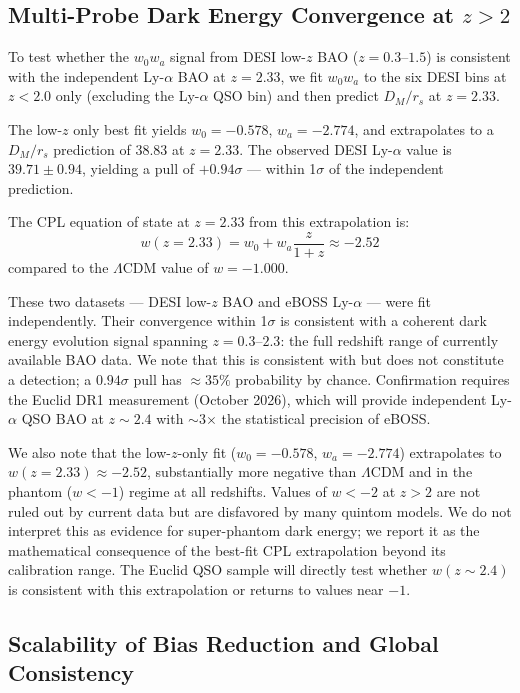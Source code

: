\documentclass[twocolumn]{aastex631}
\begin{document}
\subsection{Multi-Probe Dark Energy Convergence at $z > 2$}

To test whether the $w_0 w_a$ signal from DESI low-$z$ BAO ($z = 0.3$--$1.5$)
is consistent with the independent Ly-$\alpha$ BAO at $z = 2.33$, we fit
$w_0 w_a$ to the six DESI bins at $z < 2.0$ only (excluding the Ly-$\alpha$ QSO
bin) and then predict $D_M/r_s$ at $z = 2.33$.

The low-$z$ only best fit yields $w_0 = -0.578$, $w_a = -2.774$, and
extrapolates to a $D_M/r_s$ prediction of $38.83$ at $z = 2.33$.
The observed DESI Ly-$\alpha$ value is $39.71 \pm 0.94$, yielding a pull of
$+0.94\sigma$ --- within 1$\sigma$ of the independent prediction.

The CPL equation of state at $z = 2.33$ from this extrapolation is:
\begin{equation}
  w(z=2.33) = w_0 + w_a \frac{z}{1+z} \approx -2.52
\end{equation}
compared to the $\Lambda$CDM value of $w = -1.000$.

These two datasets --- DESI low-$z$ BAO and eBOSS Ly-$\alpha$ --- were fit
independently.
Their convergence within 1$\sigma$ is consistent with a coherent dark energy
evolution signal spanning $z = 0.3$--$2.3$: the full redshift range of
currently available BAO data.
We note that this is consistent with but does not constitute a detection;
a $0.94\sigma$ pull has $\approx35\%$ probability by chance.
Confirmation requires the Euclid DR1 measurement (October 2026), which will
provide independent Ly-$\alpha$ QSO BAO at $z \sim 2.4$ with $\sim$3$\times$
the statistical precision of eBOSS.

We also note that the low-$z$-only fit ($w_0 = -0.578$, $w_a = -2.774$)
extrapolates to $w(z=2.33) \approx -2.52$, substantially more negative than
$\Lambda$CDM and in the phantom ($w < -1$) regime at all redshifts.
Values of $w < -2$ at $z > 2$ are not ruled out by current data but are
disfavored by many quintom models.
We do not interpret this as evidence for super-phantom dark energy; we report it
as the mathematical consequence of the best-fit CPL extrapolation beyond its
calibration range.
The Euclid QSO sample will directly test whether $w(z \sim 2.4)$ is consistent
with this extrapolation or returns to values near $-1$.

\subsection{Scalability of Bias Reduction and Global Consistency}
\end{document}
